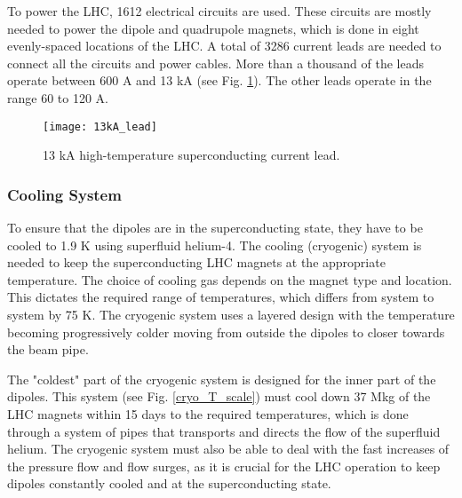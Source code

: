 \begin{normalsize}
To power the LHC, 1612 electrical circuits are used. These circuits are mostly needed to power the dipole and quadrupole magnets, which is done in eight evenly-spaced locations of the LHC. A total of 3286 current leads are needed to connect all the circuits and power cables. More than a thousand of the leads operate between 600 A and 13 kA (see Fig. \ref{13kA_lead}). The other leads operate in the range 60 to 120 A. 


\begin{figure}[H]
  \centering
  \texttt{[image: 13kA\_lead]}
  \caption{13 kA high-temperature superconducting current lead.}\label{13kA_lead}
\end{figure}



\subsubsection{Cooling System}\label{sec:cryogenic}

To ensure that the dipoles are in the superconducting state, they have to be cooled to 1.9 K using superfluid helium-4. The cooling (cryogenic) system is needed to keep the superconducting LHC magnets at the appropriate temperature. The choice of cooling gas depends on the magnet type and location. This dictates the required range of temperatures, which differs from system to system by 75 K. The cryogenic system uses a layered design with the temperature becoming progressively colder moving from outside the dipoles to closer towards the beam pipe. 

The "coldest" part of the cryogenic system is designed for the inner part of the dipoles. This system (see Fig. \ref{cryo_T_scale}) must cool down 37 Mkg of the LHC magnets within 15 days to the required temperatures, which is done through a system of pipes that transports and directs the flow of the superfluid helium. The cryogenic system must also be able to deal with the fast increases of the pressure flow and flow surges, as it is crucial for the LHC operation to keep dipoles constantly cooled and at the superconducting state.





\end{normalsize}

